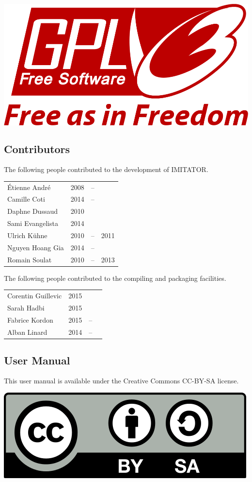 \documentclass[a4paper,11pt]{report}
\newcommand{\imitator}{\textsf{IMITATOR}}
\begin{document}
\begin{center}
	\includegraphics[width=.3\textwidth]{images/GPLv3_Logo.png}
\end{center}

\bigskip

\subsection*{Contributors}
The following people contributed to the development of \imitator{}.


\begin{tabular}{l l @{ } c @{ } l}
	Étienne André & 2008 & -- & \\
	Camille Coti & 2014 & -- & \\
	Daphne Dussaud & 2010 & & \\
	Sami Evangelista & 2014 & & \\
	Ulrich Kühne & 2010 & -- & 2011 \\
	Nguyen Hoang Gia & 2014 & -- & \\
	Romain Soulat & 2010 & -- & 2013 \\
\end{tabular}

\bigskip

The following people contributed to the compiling and packaging facilities.

\begin{tabular}{l l @{ } c @{ } l}
	Corentin Guillevic & 2015 & & \\
	Sarah Hadbi & 2015 & & \\
	Fabrice Kordon & 2015 & -- & \\
	Alban Linard & 2014 & -- \\
\end{tabular}


\bigskip

\subsection*{User Manual}
This user manual is available under the Creative Commons CC-BY-SA license.

\begin{center}
	\includegraphics[width=.2\textwidth]{images/CC-BY-SA_500.png}
\end{center}
\end{document}
